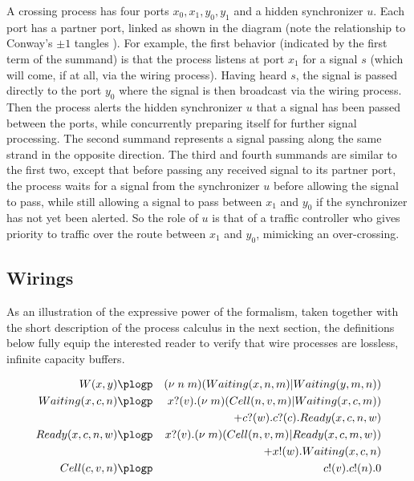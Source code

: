 A crossing process has four ports $x_0,x_1,y_0,y_1$ and a hidden
synchronizer $u$. Each port has a partner port, linked as shown in the
diagram (note the relationship to Conway's $\pm 1$ tangles
\cite{Conway1970An-enumeration-}). For example, the first behavior (indicated by the first
term of the summand) is that the process listens at port $x_1$ for a
signal $s$ (which will come, if at all, via the wiring
process). Having heard $s$, the signal is passed directly to the port
$y_0$ where the signal is then broadcast via the wiring process. Then
the process alerts the hidden synchronizer $u$ that a signal has been
passed between the ports, while concurrently preparing itself for
further signal processing. The second summand represents a signal
passing along the same strand in the opposite direction. The third and
fourth summands are similar to the first two, except that before
passing any received signal to its partner port, the process waits for
a signal from the synchronizer $u$ before allowing the signal to
pass, while still allowing a signal to pass between $x_1$ and $y_0$ if the synchronizer has not yet been alerted. So the role of $u$ is that of a traffic controller who gives
priority to traffic over the route between $x_1$ and $y_0$, mimicking
an over-crossing.

\subsection{Wirings}\label{sub:wirings} %

As an illustration of the expressive power of the formalism, taken
together with the short description of the process calculus in the next
section, the definitions below fully equip the interested reader to
verify that wire processes are lossless, infinite capacity buffers. 


\begin{eqnarray*}
    W(x,y) & \plogp & (\nu \; n \; m)(Waiting(x,n,m) | Waiting(y,m,n)) \nonumber \\
Waiting(x,c,n) & \plogp   & x?(v).(\nu \; m)(Cell(n,v,m) | Waiting(x,c,m)) \nonumber \\
  & & + c?(w).c?(c).Ready(x,c,n,w) \nonumber \\
  Ready(x,c,n,w) & \plogp  & x?(v).(\nu \; m)(Cell(n,v,m) | Ready(x,c,m,w)) \nonumber \\
  & & + x!(w).Waiting(x,c,n) \nonumber \\
  Cell(c,v,n) & \plogp & c!(v).c!(n).0 \nonumber
\end{eqnarray*}

